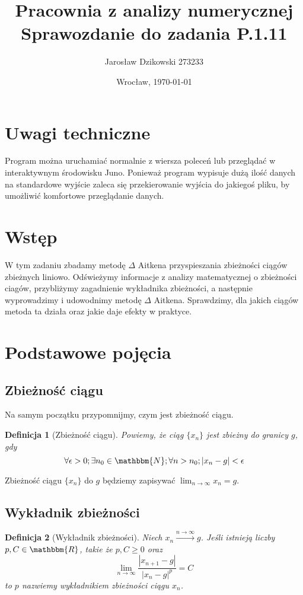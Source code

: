 \documentclass{article}
\author{Jarosław Dzikowski 273233}
\date{Wrocław, \today}
\title{\textbf{Pracownia z analizy numerycznej} \\ Sprawozdanie do zadania \textbf{P.1.11}}
\newtheorem{defi}{Definicja}
\begin{document}
\maketitle
\section{Uwagi techniczne}
Program można uruchamiać normalnie z wiersza poleceń lub przeglądać w interaktywnym środowisku Juno. Ponieważ program wypisuje dużą ilość danych na standardowe wyjście zaleca się przekierowanie wyjścia do jakiegoś pliku, by umożliwić komfortowe przeglądanie danych.

\section{Wstęp}
W tym zadaniu zbadamy metodę $\Delta$ Aitkena przyspieszania zbieżności ciągów zbieżnych liniowo. Odświeżymy informacje z analizy matematycznej o zbieżności ciagów, przybliżymy zagadnienie wykładnika zbieżności, a następnie wyprowadzimy i udowodnimy metodę $\Delta$ Aitkena. Sprawdzimy, dla jakich ciągów metoda ta działa oraz jakie daje efekty w praktyce.

\section{Podstawowe pojęcia}

\subsection{Zbieżność ciągu}
Na samym początku przypomnijmy, czym jest zbieżność ciągu. 

\begin{defi}[Zbieżność ciągu]

Powiemy, że ciąg $\{x_n\}$ jest zbieżny do granicy $g$, gdy 
\begin{equation}
\forall{\epsilon > 0} ; \exists{n_0 \in \mathbbm{N}} ; \forall{n > n_0} ; |x_n - g| < \epsilon
\end{equation}

\end{defi}

Zbieżność ciągu $\{x_n\}$ do $g$ będziemy zapisywać $\lim_{n \to \infty} x_n = g $.

\subsection{Wykładnik zbieżności}
\begin{defi}[Wykładnik zbieżności]
Niech $x_n \xrightarrow{n \to \infty} g$. Jeśli istnieją liczby $p, C \in \mathbbm{R}$, takie że $p,C \ge 0$ oraz
\begin{equation}
\lim_{n \to \infty} \frac{|x_{n+1} - g|}{|x_n - g|^p} = C
\end{equation}
to $p$ nazwiemy wykładnikiem zbieżności ciągu $x_n$.
\end{defi}
\end{document}
